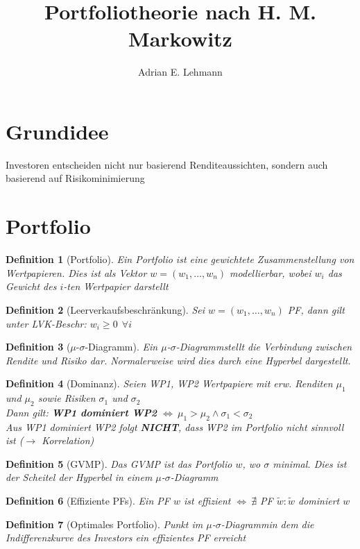 \documentclass[a4paper]{article}
\title{Portfoliotheorie nach H. M. Markowitz}
\author{Adrian E. Lehmann}
\theoremstyle{break}
\newcommand{\msd}{$\mu$-$\sigma$-Diagramm}
\newtheorem{defi}{Definition}[section]
\begin{document}
        \maketitle
        \tableofcontents
        \newpage


\section{Grundidee}
    Investoren entscheiden nicht nur basierend  Renditeaussichten, sondern auch basierend auf Risikominimierung
\section{Portfolio}
    \begin{defi}[Portfolio]
        Ein Portfolio ist eine gewichtete Zusammenstellung von Wertpapieren. Dies ist als Vektor $w = (w_1, \dots, w_n)$ modellierbar, wobei $w_i$ das Gewicht des $i$-ten Wertpapier darstellt
    \end{defi}
    \begin{defi}[Leerverkaufsbeschränkung]
        Sei $w = (w_1, \dots, w_n)$ PF, dann gilt unter LVK-Beschr: $w_i \geq 0 ~ ~ \forall i$
    \end{defi}
    \begin{defi}[\msd]
        Ein \msd stellt die Verbindung zwischen Rendite und Risiko dar. Normalerweise wird dies durch eine Hyperbel dargestellt.
    \end{defi}
    \begin{defi}[Dominanz]
        Seien WP1, WP2 Wertpapiere mit erw. Renditen $\mu_1$ und $\mu_2$ sowie Risiken $\sigma_1$ und $\sigma_2$\\
    Dann gilt: \textbf{WP1 dominiert WP2} $\Longleftrightarrow ~ \mu_1 > \mu_2 \wedge \sigma_1 < \sigma_2$\\
        \emph{Aus WP1 dominiert WP2 folgt \textbf{NICHT}, dass WP2 im Portfolio nicht sinnvoll ist ($\rightarrow$ Korrelation)}
    \end{defi}
    \begin{defi}[GVMP]
        Das GVMP ist das Portfolio $w$, wo $\sigma$ minimal. Dies ist der Scheitel der Hyperbel in einem \msd 
    \end{defi}
    \begin{defi}[Effiziente PFs]
        Ein PF $w$ ist effizient $\Longleftrightarrow ~ \nexists$ PF $\tilde{w}: \tilde{w}$ dominiert $w$
    \end{defi}
    \begin{defi}[Optimales Portfolio]
        Punkt im \msd in dem die Indifferenzkurve des Investors ein effizientes PF erreicht
    \end{defi}
\end{document}

